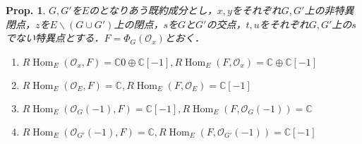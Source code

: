\documentclass[uplatex,a4paper,11pt,dvipdfmx]{jsarticle}
\theoremstyle{mystyle} %
\newtheorem{proposition}[theorem]{Prop.}
\DeclareMathOperator{\Hom}{Hom}
\begin{document}
\begin{proposition}
	$G, G'$を$E$のとなりあう既約成分とし，$x,y$をそれぞれ$G, G'$上の非特異閉点，$z$を$E \backslash (G \cup G')$上の閉点，$s$を$G$と$G'$の交点，$t, u$をそれぞれ$G, G'$上の$s$でない特異点とする．$F = \Phi_G(\mathcal{O}_x)$とおく．
	\begin{enumerate}
		\item $R\Hom_E(\mathcal{O}_x, F) = \mathbb{C}0 \oplus \mathbb{C}[-1],R\Hom_E(F, \mathcal{O}_x) = \mathbb{C} \oplus \mathbb{C}[-1]$
		\item $R\Hom_E(\mathcal{O}_E, F) = \mathbb{C} ,R\Hom_E(F, \mathcal{O}_E) = \mathbb{C}[-1]$
		\item $R\Hom_E(\mathcal{O}_G(-1), F) = \mathbb{C}[-1] ,R\Hom_E(F, \mathcal{O}_G(-1)) = \mathbb{C}$
		\item $R\Hom_E(\mathcal{O}_{G'}(-1), F) = \mathbb{C} ,R\Hom_E(F, \mathcal{O}_{G'}(-1)) = \mathbb{C}[-1]$
	\end{enumerate}
\end{proposition}
\end{document}
